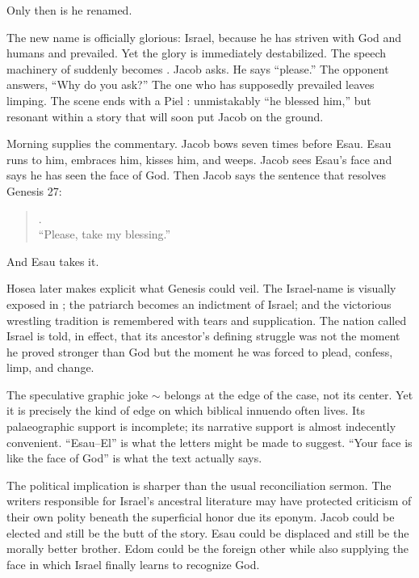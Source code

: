 Only then is he renamed.

The new name is officially glorious: Israel, because he has striven with God and humans and prevailed. Yet the glory is immediately destabilized. The speech machinery of  suddenly becomes . Jacob asks. He says ``please.'' The opponent answers, ``Why do you ask?'' The one who has supposedly prevailed leaves limping. The scene ends with a Piel : unmistakably ``he blessed him,'' but resonant within a story that will soon put Jacob on the ground.

Morning supplies the commentary. Jacob bows seven times before Esau. Esau runs to him, embraces him, kisses him, and weeps. Jacob sees Esau's face and says he has seen the face of God. Then Jacob says the sentence that resolves Genesis 27:

\begin{quote}\small
{}.\\
``Please, take my blessing.''
\end{quote}

And Esau takes it.

Hosea later makes explicit what Genesis could veil. The Israel-name is visually exposed in ; the patriarch becomes an indictment of Israel; and the victorious wrestling tradition is remembered with tears and supplication. The nation called Israel is told, in effect, that its ancestor's defining struggle was not the moment he proved stronger than God but the moment he was forced to plead, confess, limp, and change.

The speculative graphic joke  $\sim$  belongs at the edge of the case, not its center. Yet it is precisely the kind of edge on which biblical innuendo often lives. Its palaeographic support is incomplete; its narrative support is almost indecently convenient. ``Esau--El'' is what the letters might be made to suggest. ``Your face is like the face of God'' is what the text actually says.

The political implication is sharper than the usual reconciliation sermon. The writers responsible for Israel's ancestral literature may have protected criticism of their own polity beneath the superficial honor due its eponym. Jacob could be elected and still be the butt of the story. Esau could be displaced and still be the morally better brother. Edom could be the foreign other while also supplying the face in which Israel finally learns to recognize God.

